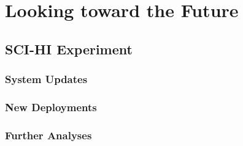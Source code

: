 \chapter{Looking toward the Future}\label{Ch:Conclude}

\section{SCI-HI Experiment}

\subsection{System Updates}

\subsection{New Deployments}

\subsection{Further Analyses}

